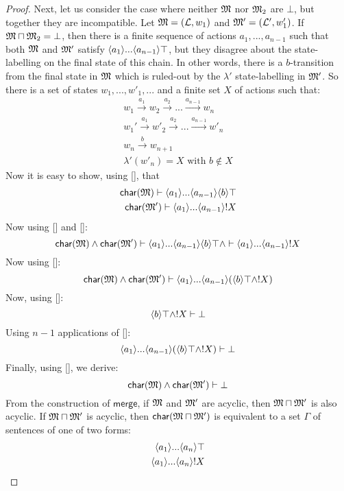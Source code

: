 \begin{proof}
Next, let us consider the case where neither $\frak{M}$ nor $\frak{M}_2$ are $\bot$, but together they are incompatible.
Let $\frak{M} = (\mathcal{L}, w_1)$ and $\frak{M}' = (\mathcal{L}', w'_1)$.
If $\frak{M} \sqcap \frak{M}_2 = \bot$, then there is a finite sequence of actions $a_1, ..., a_{n-1}$ such that both $\frak{M}$ and $\frak{M}'$ satisfy $\langle a_1 \rangle ... \langle a_{n-1} \rangle \top$, but they disagree about the state-labelling on the final state of this chain. In other words, there is a $b$-transition from the final state in $\frak{M}$ which is ruled-out by the $\lambda'$ state-labelling in $\frak{M}'$. So there is a set of states $w_1, ..., w'_1, ...$ and a finite set $X$ of actions such that:
\begin{eqnarray*}
w_1 \xrightarrow{a_1} w_2 \xrightarrow{a_2} ... \xrightarrow{a_{n-1}} w_n \\
w_1' \xrightarrow{a_1} w'_2 \xrightarrow{a_2} ... \xrightarrow{a_{n-1}} w'_n \\
w_n \xrightarrow{b} w_{n+1} \\
\lambda'(w'_n) = X \text{ with } b \notin X
\end{eqnarray*}
Now it is easy to show, using [], that
\begin{eqnarray*}
\mathsf{char}(\mathsf{\frak{M}}) \vdash \langle a_1 \rangle ... \langle a_{n-1} \rangle \langle b \rangle \top \\
\mathsf{char}(\mathsf{\frak{M}'}) \vdash \langle a_1 \rangle ... \langle a_{n-1} \rangle ! X
\end{eqnarray*}
Now using [] and []:
\[
\mathsf{char}(\mathsf{\frak{M}}) \land \mathsf{char}(\mathsf{\frak{M}}') \vdash  \langle a_1 \rangle ... \langle a_{n-1} \rangle \langle b \rangle \top \land  \vdash \langle a_1 \rangle ... \langle a_{n-1} \rangle ! X
\]
Now using []:
\[
\mathsf{char}(\mathsf{\frak{M}}) \land \mathsf{char}(\mathsf{\frak{M}}') \vdash  \langle a_1 \rangle ... \langle a_{n-1} \rangle (\langle b \rangle \top \land ! X)
\]
Now, using []:
\[
\langle b \rangle \top \land ! X \vdash \bot
\]
Using $n-1$ applications of  []:
\[
\langle a_1 \rangle ... \langle a_{n-1} \rangle (\langle b \rangle \top \land ! X) \vdash \bot
\]
Finally, using [], we derive:
\[
\mathsf{char}(\mathsf{\frak{M}}) \land \mathsf{char}(\mathsf{\frak{M}}') \vdash \bot
\]
 From the construction of
$\mathsf{merge}$, if $\frak{M}$ and $\frak{M}'$ are acyclic, then $\frak{M} \sqcap
\frak{M}'$ is also acyclic.  If $\frak{M} \sqcap \frak{M}'$ is acyclic, then
$\mathsf{char}(\frak{M} \sqcap \frak{M}')$ is equivalent to a set $\Gamma$ of
sentences of one of two forms:
\begin{eqnarray*}
\langle a_1 \rangle ... \langle a_n \rangle \top \\
\langle a_1 \rangle ... \langle a_n \rangle ! X
\end{eqnarray*}


\end{proof}
